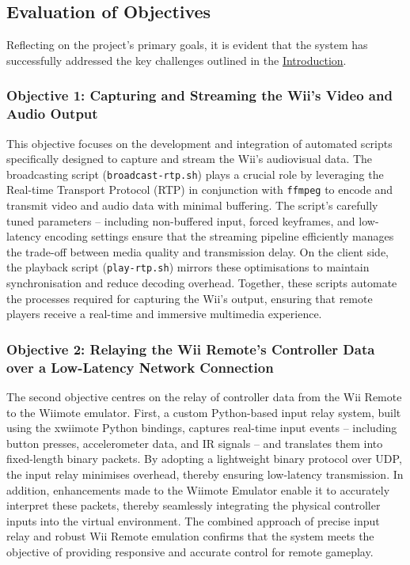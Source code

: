 \subsection{Evaluation of Objectives}
Reflecting on the project’s primary goals, it is evident that the system has successfully addressed the key challenges outlined in the \hyperlink{chapter:introduction}{Introduction}.

\subsubsection{Objective 1: Capturing and Streaming the Wii's Video and Audio Output}
This objective focuses on the development and integration of automated scripts
specifically designed to capture and stream the Wii's audiovisual data. The
broadcasting script (\texttt{broadcast-rtp.sh}) plays a crucial role by
leveraging the Real-time Transport Protocol (RTP) in conjunction with
\texttt{ffmpeg} to encode and transmit video and audio data with minimal
buffering. The script's carefully tuned parameters -- including non-buffered input,
forced keyframes, and low-latency encoding settings ensure that the streaming
pipeline efficiently manages the trade-off between media quality and
transmission delay. On the client side, the playback script
(\texttt{play-rtp.sh}) mirrors these optimisations to maintain synchronisation
and reduce decoding overhead. Together, these scripts automate the processes
required for capturing the Wii’s output, ensuring that remote players receive a
real-time and immersive multimedia experience.

\subsubsection{Objective 2: Relaying the Wii Remote's Controller Data over a Low-Latency Network Connection}
The second objective centres on the relay of controller data from the Wii Remote
to the Wiimote emulator. First, a custom Python-based input relay system, built
using the xwiimote Python bindings, captures real-time input events -- including
button presses, accelerometer data, and IR signals -- and translates them into
fixed-length binary packets. By adopting a lightweight binary protocol over UDP,
the input relay minimises overhead, thereby ensuring low-latency transmission.
In addition, enhancements made to the Wiimote Emulator enable it to accurately
interpret these packets, thereby seamlessly integrating the physical controller
inputs into the virtual environment. The combined approach of precise input
relay and robust Wii Remote emulation confirms that the system meets the
objective of providing responsive and accurate control for remote gameplay.

